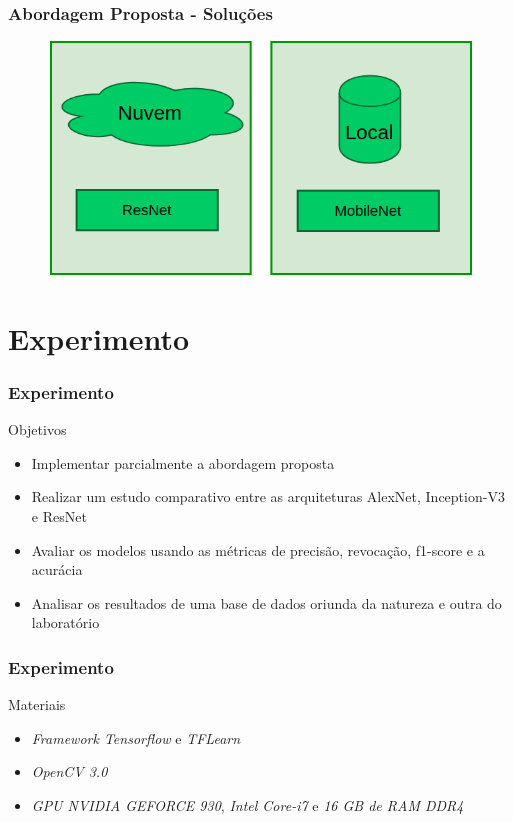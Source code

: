 \documentclass{beamer}
\begin{document}
\begin{frame}
\frametitle{Abordagem Proposta - Soluções}
\begin{figure}
\centering
\includegraphics[scale=0.35]{figuras/abordagem_7.png}
\label{fig:arquitetura3}
\end{figure}
\end{frame}



 

\section{Experimento}

\begin{frame}
 \frametitle{Experimento}
\begin{block}{Objetivos}
\begin{itemize}
\pause
\item Implementar parcialmente a abordagem proposta
\pause
\item Realizar um estudo comparativo entre as arquiteturas AlexNet, Inception-V3 e ResNet
\pause
\item Avaliar os modelos usando as métricas de precisão, revocação, f1-score e a acurácia
\pause
\item Analisar os resultados de uma base de dados oriunda da natureza e outra do laboratório

\end{itemize}
\end{block} 
\end{frame}


\begin{frame}
 \frametitle{Experimento}
\begin{block}{Materiais}
\begin{itemize}
\pause
\item \textit{Framework Tensorflow} e \textit{TFLearn}
\pause
\item \textit{OpenCV 3.0}
\pause
\item \textit{GPU NVIDIA GEFORCE 930}, \textit{Intel Core-i7} e \textit{16 GB de RAM DDR4}

\end{itemize}
\end{block} 
\end{frame}
\end{document}

